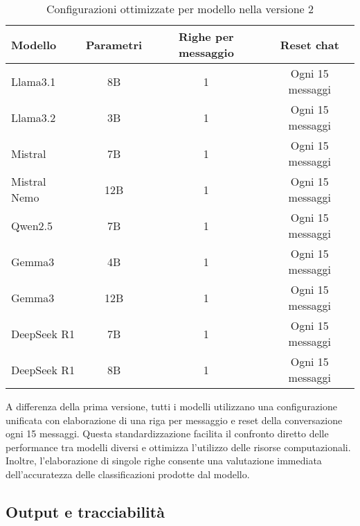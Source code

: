 \documentclass[12pt]{report}
\begin{document}
\begin{table}[h!]
    \centering
    \begin{tabular}{|l|c|c|c|}
        \hline
        \textbf{Modello} & \textbf{Parametri} & \textbf{Righe per messaggio} & \textbf{Reset chat} \\ \hline
        Llama3.1         & 8B                 & 1                            & Ogni 15 messaggi    \\ \hline
        Llama3.2         & 3B                 & 1                            & Ogni 15 messaggi    \\ \hline
        Mistral          & 7B                 & 1                            & Ogni 15 messaggi    \\ \hline
        Mistral Nemo     & 12B                & 1                            & Ogni 15 messaggi    \\ \hline
        Qwen2.5          & 7B                 & 1                            & Ogni 15 messaggi    \\ \hline
        Gemma3           & 4B                 & 1                            & Ogni 15 messaggi    \\ \hline
        Gemma3           & 12B                & 1                            & Ogni 15 messaggi    \\ \hline
        DeepSeek R1      & 7B                 & 1                            & Ogni 15 messaggi    \\ \hline
        DeepSeek R1      & 8B                 & 1                            & Ogni 15 messaggi    \\ \hline
    \end{tabular}
    \caption{Configurazioni ottimizzate per modello nella versione 2}
    \label{tab:modelli_llm_ver2}
\end{table}

A differenza della prima versione, tutti i modelli utilizzano una configurazione unificata con elaborazione di una riga per messaggio e reset della conversazione ogni 15 messaggi. Questa standardizzazione facilita il confronto diretto delle performance tra modelli diversi e ottimizza l'utilizzo delle risorse computazionali. \\
Inoltre, l'elaborazione di singole righe consente una valutazione immediata dell'accuratezza delle classificazioni prodotte dal modello.

\subsection{Output e tracciabilità}
\label{subsec:ver2_output}
\end{document}
